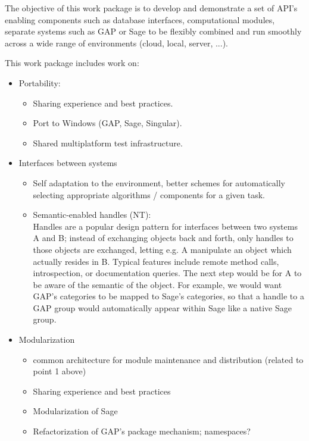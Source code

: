 \addtocounter{wpno}{1}
\begin{Workpackage}{\thewpno}
\WPTitle{\wpname{\thewpno}}

\begin{WPObjectives}
  The objective of this work package is to develop and demonstrate a
  set of API's enabling components such as database interfaces,
  computational modules, separate systems such as GAP or Sage to be
  flexibly combined and run smoothly across a wide range of
  environments (cloud, local, server, ...).
\end{WPObjectives}

\begin{WPDescription}
  This work package includes work on:
  \begin{itemize}
  \item Portability:
    \begin{itemize}
    \item Sharing experience and best practices.
    \item Port to Windows (GAP, Sage, Singular).
    \item Shared multiplatform test infrastructure.
    \end{itemize}

  \item Interfaces between systems
    \begin{itemize}
    \item Self adaptation to the environment, better schemes for
      automatically selecting appropriate algorithms / components for
      a given task.
    \item Semantic-enabled handles (NT):\\
      Handles are a popular design pattern for interfaces between two
      systems A and B; instead of exchanging objects back and forth,
      only handles to those objects are exchanged, letting e.g. A
      manipulate an object which actually resides in B. Typical
      features include remote method calls, introspection, or
      documentation queries. The next step would be for A to be aware
      of the semantic of the object. For example, we would want GAP's
      categories to be mapped to Sage's categories, so that a handle
      to a GAP group would automatically appear within Sage like a
      native Sage group.
    \end{itemize}

  \item Modularization
    \begin{itemize}
    \item common architecture for module maintenance and
      distribution (related to point 1 above)
    \item Sharing experience and best practices
    \item Modularization of Sage
    \item Refactorization of GAP's package mechanism; namespaces?
    \end{itemize}


\end{itemize}
\end{WPDescription}
\end{Workpackage}
